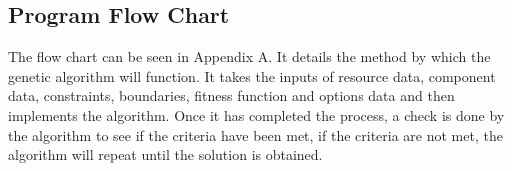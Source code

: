 \subsection{Program Flow Chart}

The flow chart can be seen in Appendix A. It details the method by which the genetic algorithm will function. It takes the inputs of resource data, component data, constraints, boundaries, fitness function and options data and then implements the algorithm. Once it has completed the process, a check is done by the algorithm to see if the criteria have been met, if the criteria are not met, the algorithm will repeat until the solution is obtained.




 